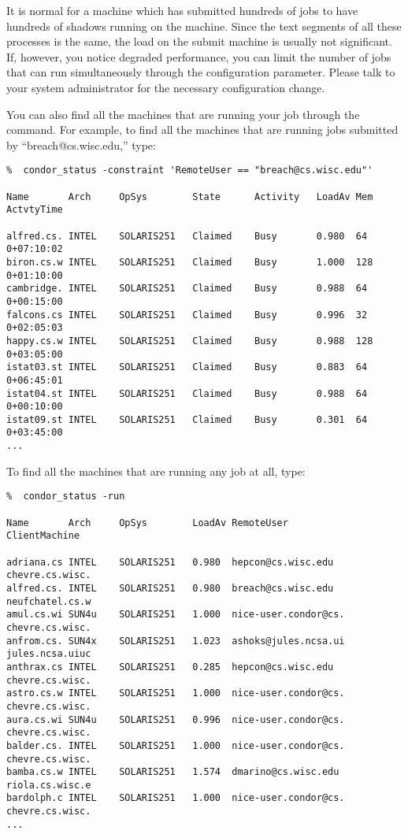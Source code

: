 It is normal for a machine which has submitted hundreds of jobs to have 
hundreds of shadows running on the machine.  Since the text segments of 
all these processes is the same, the load on the submit machine is usually 
not significant.  If, however, you notice degraded performance, you can limit 
the number of jobs that can run simultaneously through the 
 configuration parameter.  Please talk to your 
system administrator for the necessary configuration change.

You can also find all the machines that are running your job through the
 command.  For example, to find all the machines that are
running jobs submitted by ``breach@cs.wisc.edu,'' type:
\begin{verbatim}
%  condor_status -constraint 'RemoteUser == "breach@cs.wisc.edu"'

Name       Arch     OpSys        State      Activity   LoadAv Mem  ActvtyTime

alfred.cs. INTEL    SOLARIS251   Claimed    Busy       0.980  64    0+07:10:02
biron.cs.w INTEL    SOLARIS251   Claimed    Busy       1.000  128   0+01:10:00
cambridge. INTEL    SOLARIS251   Claimed    Busy       0.988  64    0+00:15:00
falcons.cs INTEL    SOLARIS251   Claimed    Busy       0.996  32    0+02:05:03
happy.cs.w INTEL    SOLARIS251   Claimed    Busy       0.988  128   0+03:05:00
istat03.st INTEL    SOLARIS251   Claimed    Busy       0.883  64    0+06:45:01
istat04.st INTEL    SOLARIS251   Claimed    Busy       0.988  64    0+00:10:00
istat09.st INTEL    SOLARIS251   Claimed    Busy       0.301  64    0+03:45:00
...
\end{verbatim}
To find all the machines that are running any job at all, type:
\begin{verbatim}
%  condor_status -run

Name       Arch     OpSys        LoadAv RemoteUser           ClientMachine  

adriana.cs INTEL    SOLARIS251   0.980  hepcon@cs.wisc.edu   chevre.cs.wisc.
alfred.cs. INTEL    SOLARIS251   0.980  breach@cs.wisc.edu   neufchatel.cs.w
amul.cs.wi SUN4u    SOLARIS251   1.000  nice-user.condor@cs. chevre.cs.wisc.
anfrom.cs. SUN4x    SOLARIS251   1.023  ashoks@jules.ncsa.ui jules.ncsa.uiuc
anthrax.cs INTEL    SOLARIS251   0.285  hepcon@cs.wisc.edu   chevre.cs.wisc.
astro.cs.w INTEL    SOLARIS251   1.000  nice-user.condor@cs. chevre.cs.wisc.
aura.cs.wi SUN4u    SOLARIS251   0.996  nice-user.condor@cs. chevre.cs.wisc.
balder.cs. INTEL    SOLARIS251   1.000  nice-user.condor@cs. chevre.cs.wisc.
bamba.cs.w INTEL    SOLARIS251   1.574  dmarino@cs.wisc.edu  riola.cs.wisc.e
bardolph.c INTEL    SOLARIS251   1.000  nice-user.condor@cs. chevre.cs.wisc.
...
\end{verbatim}

